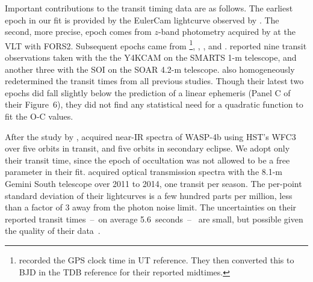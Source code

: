 \documentclass[12pt,twocolumn,tighten]{aastex62}
\begin{document}
Important contributions to the transit timing data are as follows.
The earliest epoch in our fit is provided by the EulerCam lightcurve
observed by \citet{wilson_wasp-4b_2008}.  The second, more precise,
epoch comes from $z$-band photometry acquired by
\citet{gillon_improved_2009} at the VLT with FORS2.
Subsequent epochs came from \citet{winn_transit_2009}\footnote{\citet{winn_transit_2009} recorded the GPS clock
  time in UT reference. They then converted this to BJD in the TDB
  reference for their reported midtimes.},
\citet{dragomir_terms_2011}, \citet{sanchis-ojeda_starspots_2011},
and \citet{nikolov_wasp-4b_2012}.
\citet{hoyer_tramos_2013} reported
nine transit observations taken with the the Y4KCAM on the SMARTS 1-m
telescope, and another three with the SOI on the SOAR 4.2-m telescope.
\citet{hoyer_tramos_2013} also homogeneously
redetermined the transit times from all previous studies.  Though
their latest two epochs did fall slightly below the prediction of a
linear ephemeris (Panel C of their Figure~6), they did not find any
statistical need for a quadratic function to fit the O-C values.

After the study by \citet{hoyer_tramos_2013},
\citet{ranjan_atmospheric_2014} acquired near-IR spectra of WASP-4b
using HST's WFC3 over five orbits in transit, and five orbits in
secondary eclipse.  We adopt only their transit time, since the epoch
of occultation was not allowed to be a free parameter in their fit.
\citet{huitson_gemini_2017} acquired optical transmission spectra with
the 8.1-m Gemini South telescope over 2011 to 2014, one transit per
season.  The per-point standard deviation of their lightcurves is a
few hundred parts per million, less than a factor of 3 away from the
photon noise limit.  The uncertainties on their reported transit
times~--~on average 5.6~seconds~--~ are small, but possible given the
quality of their data~\citep[cf.][]{carter_analytic_2008}.
\end{document}
